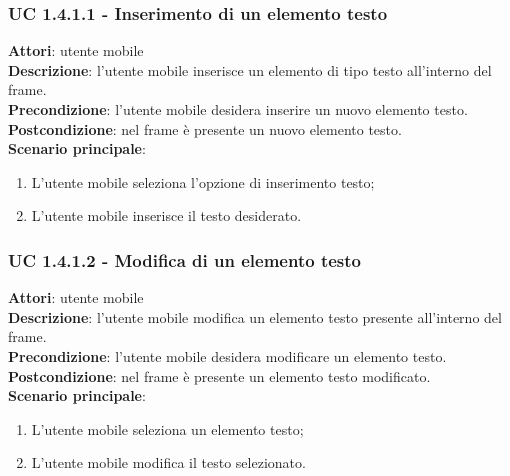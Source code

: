 \subsubsection{UC 1.4.1.1 - Inserimento di un elemento testo}{
	\label{uc1.4.1.1}
	\textbf{Attori}: utente mobile \\
	\textbf{Descrizione}: l'utente mobile inserisce un elemento di tipo testo all'interno del frame. \\
	\textbf{Precondizione}: l'utente mobile desidera inserire un nuovo elemento testo.	\\
	\textbf{Postcondizione}: nel frame è presente un nuovo elemento testo.	\\
	\textbf{Scenario principale}:
	\begin{enumerate}
		\item L'utente mobile seleziona l'opzione di inserimento testo;
		\item L'utente mobile inserisce il testo desiderato.
	\end{enumerate}
	}
\subsubsection{UC 1.4.1.2 - Modifica di un elemento testo}{
	\label{uc1.4.1.2}
	\textbf{Attori}: utente mobile \\
	\textbf{Descrizione}: l'utente mobile modifica un elemento testo presente all'interno del frame. \\
	\textbf{Precondizione}: l'utente mobile desidera modificare un elemento testo.	\\
	\textbf{Postcondizione}: nel frame è presente un elemento testo modificato.	\\
	\textbf{Scenario principale}:
	\begin{enumerate}
		\item L'utente mobile seleziona un elemento testo;
		\item L'utente mobile modifica il testo selezionato.
	\end{enumerate}
	}	
